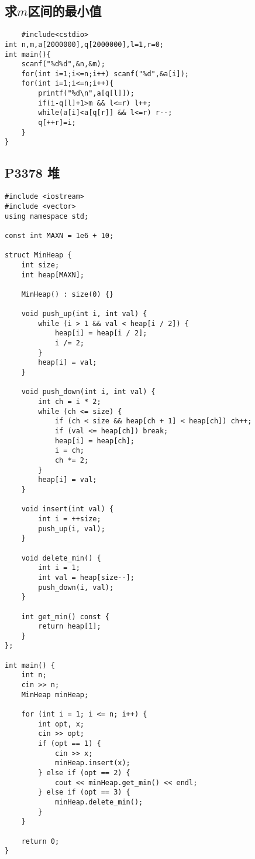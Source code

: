 \documentclass{ctexart}
\begin{document}
\subsection{求$m$区间的最小值}

\begin{lstlisting}
    #include<cstdio>
int n,m,a[2000000],q[2000000],l=1,r=0;
int main(){
    scanf("%d%d",&n,&m);
    for(int i=1;i<=n;i++) scanf("%d",&a[i]);
    for(int i=1;i<=n;i++){
        printf("%d\n",a[q[l]]);
        if(i-q[l]+1>m && l<=r) l++;
        while(a[i]<a[q[r]] && l<=r) r--;
        q[++r]=i;
    }
}
\end{lstlisting}

\subsection{P3378 堆}
\begin{lstlisting}
#include <iostream>
#include <vector>
using namespace std;

const int MAXN = 1e6 + 10;

struct MinHeap {
    int size;
    int heap[MAXN];

    MinHeap() : size(0) {}

    void push_up(int i, int val) {
        while (i > 1 && val < heap[i / 2]) {
            heap[i] = heap[i / 2];
            i /= 2;
        }
        heap[i] = val;
    }

    void push_down(int i, int val) {
        int ch = i * 2;
        while (ch <= size) {
            if (ch < size && heap[ch + 1] < heap[ch]) ch++;
            if (val <= heap[ch]) break;
            heap[i] = heap[ch];
            i = ch;
            ch *= 2;
        }
        heap[i] = val;
    }

    void insert(int val) {
        int i = ++size;
        push_up(i, val);
    }

    void delete_min() {
        int i = 1;
        int val = heap[size--];
        push_down(i, val);
    }

    int get_min() const {
        return heap[1];
    }
};

int main() {
    int n;
    cin >> n;
    MinHeap minHeap;

    for (int i = 1; i <= n; i++) {
        int opt, x;
        cin >> opt;
        if (opt == 1) {
            cin >> x;
            minHeap.insert(x);
        } else if (opt == 2) {
            cout << minHeap.get_min() << endl;
        } else if (opt == 3) {
            minHeap.delete_min();
        }
    }

    return 0;
}

\end{lstlisting}
\end{document}
